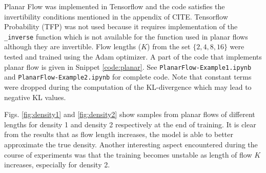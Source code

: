 \documentclass[]{article}
\newenvironment{code}{\captionsetup{type=listing}}{}
\begin{document}
Planar Flow was implemented in Tensorflow and the code satisfies the invertibility conditions mentioned in the appendix of CITE. Tensorflow Probability (TFP) was not used because it requires implementation of the \texttt{\_inverse} function which is not available for the function used in planar flows although they are invertible. Flow lengths ($K$) from the set $\{2, 4, 8, 16\}$ were tested and trained using the Adam optimizer. A part of the code that implements planar flow is given in Snippet \ref{code:planar}. See \texttt{PlanarFlow-Example1.ipynb} and \texttt{PlanarFlow-Example2.ipynb} for complete code. Note that constant terms were dropped during the computation of the KL-divergence which may lead to negative KL values.

Figs. \ref{fig:density1} and \ref{fig:density2} show samples from planar flows of different lengths for density 1 and density 2 respectively at the end of training. It is clear from the results that as flow length increases, the model is able to better approximate the true density. Another interesting aspect encountered during the course of experiments was that the training becomes unstable as length of flow $K$ increases, especially for density 2. 

\begin{code}
	\inputminted[linenos=true,frame=lines,framesep=2mm]{python}{metropolis.py}
	\label{code:mh}
\end{code}
\begin{code}
	\inputminted[linenos=true,frame=lines,framesep=2mm]{python}{planar.py}
	\label{code:planar}
\end{code}
\end{document}
